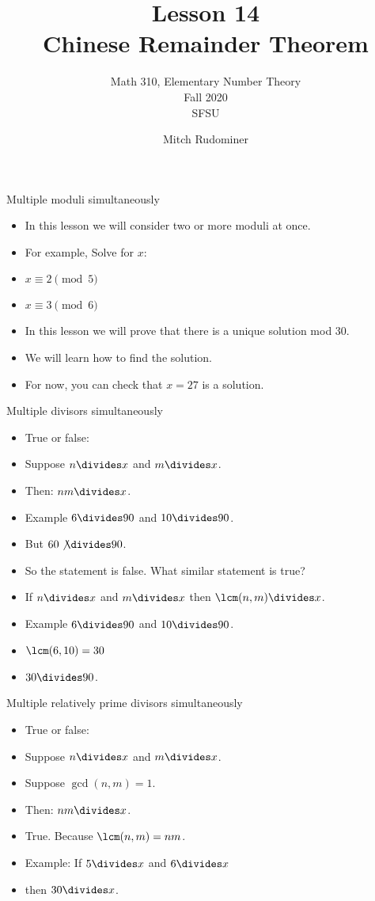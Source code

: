 \documentclass{beamer}
\title{Lesson 14 \\ Chinese Remainder Theorem}
\subtitle{Math 310, Elementary Number Theory \\ Fall 2020 \\ SFSU}
\author{Mitch Rudominer}
\date{}
\begin{document}
\begin{frame}
  \titlepage
\end{frame}

\begin{frame}{Multiple moduli simultaneously}

\begin{itemize}
  \item In this lesson we will consider two or more moduli at once.
  \item For example, Solve for $x$:
  \item $x \equiv 2 \pmod 5$
  \item $x \equiv 3 \pmod 6$
  \item In this lesson we will prove that there is a unique solution mod 30.
  \item We will learn how to find the solution.
  \item For now, you can check that $x=27$ is a solution.
\end{itemize}

\end{frame}

\begin{frame}{Multiple divisors simultaneously}

\begin{itemize}
  \item True or false:
  \item Suppose $n \divides x$ and $m\divides x$.
  \item Then: $nm \divides x$.
  \item Example $6\divides 90$ and $10\divides 90$.
  \item But $60 \not\divides 90$.
  \item So the statement is false. What similar statement is true?
  \item If $n \divides x$ and $m \divides x$ then $\lcm(n,m) \divides x$.
  \item Example $6\divides 90$ and $10\divides 90$.
  \item $\lcm(6,10) = 30$
  \item $30\divides 90$.
\end{itemize}

\end{frame}

\begin{frame}{Multiple relatively prime divisors simultaneously}

\begin{itemize}
  \item True or false:
  \item Suppose $n \divides x$ and $m\divides x$.
  \item Suppose $\gcd(n,m) = 1$.
  \item Then: $nm \divides x$.
  \item True. Because $\lcm(n,m) = nm$.
  \item Example: If $5\divides x$ and $6\divides x$
  \item then $30 \divides x$.
\end{itemize}

\end{frame}
\end{document}
